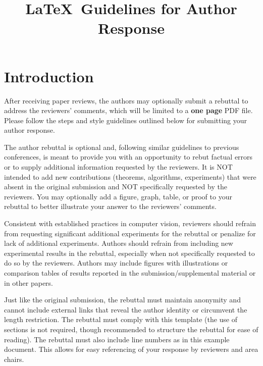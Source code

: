 \documentclass[10pt,twocolumn,letterpaper]{article}
\begin{document}
\title{\LaTeX\ Guidelines for Author Response}  %

\maketitle
\thispagestyle{empty}
\appendix


\section{Introduction}

After receiving paper reviews, the authors may optionally submit a rebuttal to address the reviewers' comments, which will be limited to a {\bf one page} PDF file.
Please follow the steps and style guidelines outlined below for submitting your author response.

The author rebuttal is optional and, following similar guidelines to previous conferences, is meant to provide you with an opportunity to rebut factual errors or to supply additional information requested by the reviewers.
It is NOT intended to add new contributions (theorems, algorithms, experiments) that were absent in the original submission and NOT specifically requested by the reviewers.
You may optionally add a figure, graph, table, or proof to your rebuttal to better illustrate your answer to the reviewers' comments.

Consistent with established practices in computer vision, reviewers should refrain from requesting significant additional experiments for the rebuttal or penalize for lack of additional experiments.
Authors should refrain from including new experimental results in the rebuttal, especially when not specifically requested to do so by the reviewers.
Authors may include figures with illustrations or comparison tables of results reported in the submission/supplemental material or in other papers.

Just like the original submission, the rebuttal must maintain anonymity and cannot include external links that reveal the author identity or circumvent the length restriction.
The rebuttal must comply with this template (the use of sections is not required, though recommended to structure the rebuttal for ease of reading).
The rebuttal must also include line numbers as in this example document.
This allows for easy referencing of your response by reviewers and area chairs.
\end{document}
